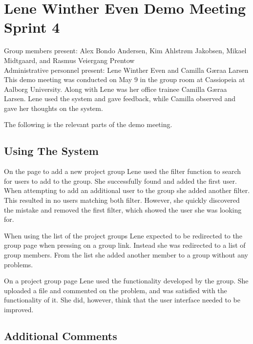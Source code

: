 \section{Lene Winther Even Demo Meeting Sprint 4}
\label{sec:lenedemotwo}
Group members present: Alex Bondo Andersen, Kim Ahlstr\o{}m Jakobsen, Mikael Midtgaard, and Rasmus Veiergang Prentow\\
Administrative personnel present: Lene Winther Even and Camilla G\ae{}raa Larsen\\

This demo meeting was conducted on May 9\ths{} in the group room at Cassiopeia at Aalborg University.
Along with Lene was her office trainee Camilla G\ae{}raa Larsen. 
Lene used the system and gave feedback, while Camilla observed and gave her thoughts on the system.

The following is the relevant parts of the demo meeting.

\subsection*{Using The System}
On the page to add a new project group Lene used the filter function to search for users to add to the group.
She successfully found and added the first user.
When attempting to add an additional user to the group she added another filter. 
This resulted in no users matching both filter. 
However, she quickly discovered the mistake and removed the first filter, which showed the user she was looking for.

When using the list of the project groups Lene expected to be redirected to the group page when pressing on a group link.
Instead she was redirected to a list of group members.
From the list she added another member to a group without any problems.

On a project group page Lene used the functionality developed by the \supervisorgroup group.
She uploaded a file and commented on the problem, and was satisfied with the functionality of it.
She did, however, think that the user interface needed to be improved.

\subsection*{Additional Comments}

